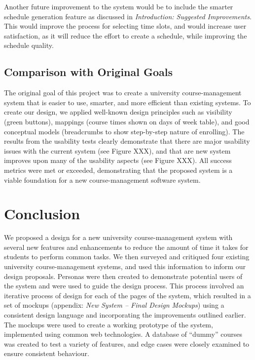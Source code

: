 \documentclass[10pt]{article}
\begin{document}
\begin{multicols}{2}
Another future improvement to the system would be to include the smarter schedule generation feature as discussed in \emph{Introduction: Suggested Improvements}. This would improve the process for selecting time slots, and would increase user satisfaction, as it will reduce the effort to create a schedule, while improving the schedule quality.

\subsection*{Comparison with Original Goals}
The original goal of this project was to create a university course-management system that is easier to use, smarter, and more efficient than existing systems. To create our design, we applied well-known design principles such as visibility (green buttons), mappings (course times shown on days of week table), and good conceptual models (breadcrumbs to show step-by-step nature of enrolling). The results from the usability tests clearly demonstrate that there are major usability issues with the current system (see Figure XXX), and that are new system improves upon many of the usability aspects (see Figure XXX). All success metrics were met or exceeded, demonstrating that the proposed system is a viable foundation for a new course-management software system.

\section*{Conclusion}
We proposed a design for a new university course-management system with several new features and enhancements to reduce the amount of time it takes for students to perform common tasks. We then surveyed and critiqued four existing university course-management systems, and used this information to inform our design proposals. Personas were then created to demonstrate potential users of the system and were used to guide the design process. This process involved an iterative process of design for each of the pages of the system, which resulted in a set of mockups (appendix: \emph{New System -- Final Design Mockups}) using a consistent design language and incorporating the improvements outlined earlier.\\

The mockups were used to create a working prototype of the system, implemented using common web technologies. A database of ``dummy'' courses was created to test a variety of features, and edge cases were closely examined to ensure consistent behaviour.\\


\end{multicols}
\end{document}
